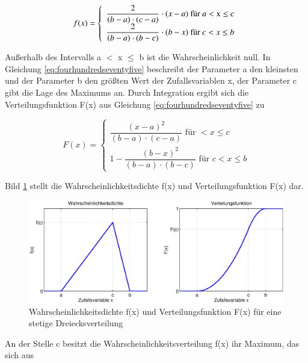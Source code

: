 \begin{equation}\label{eq:fourhundredseventyfive}
f(x)=\left\{\begin{array}{l} {\dfrac{2}{(b-a)\cdot (c-a)} \cdot (x-a)\text{ für }a<{\rm x}\le c} \\ 
{\dfrac{2}{(b-a)\cdot (b-c)} \cdot (b-x)\text{ für }c< x\le b} \end{array}\right.
\end{equation}

Au{\ss}erhalb des Intervalls a $\mathrm{<}$ x $\leq$ b ist die Wahrscheinlichkeit null. In Gleichung \eqref{eq:fourhundredseventyfive} beschreibt der Parameter a den kleinsten und der Parameter b den gr\"{o}{\ss}ten Wert der Zufallsvariablen x, der Parameter c gibt die Lage des Maximums an. Durch Integration ergibt sich die Verteilungsfunktion F(x) aus Gleichung \eqref{eq:fourhundredseventyfive} zu

\begin{equation}\label{eq:fourhundredseventysix}
F(x)=\left\{\begin{array}{l} {\dfrac{(x-a)^{2} }{(b-a)\cdot (c-a)}\text{ für }< x\le c} \\ 
{1-\dfrac{(b-x)^{2} }{(b-a)\cdot (b-c)}\text{ für }c < x\le b} \end{array}\right.
\end{equation}

Bild \ref{fig:Stetig_Dreiecksverteilung} stellt die Wahrscheinlichkeitsdichte f(x) und Verteilungsfunktion F(x) dar.

\begin{figure}[H]
  \centerline{\includegraphics[width=1\textwidth]{Kapitel4/Bilder/image24}}
  \caption{Wahrscheinlichkeitsdichte f(x) und Verteilungsfunktion F(x) f\"{u}r eine stetige Dreiecksverteilung}
  \label{fig:Stetig_Dreiecksverteilung}
\end{figure}

\noindent An der Stelle c besitzt die Wahrscheinlichkeitsverteilung f(x) ihr Maximum, das sich aus

